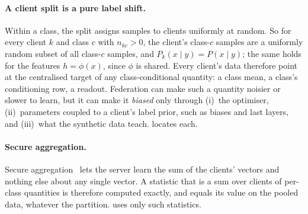 \paragraph{A client split is a pure label shift.} Within a class, the split assigns samples to clients uniformly at
random. So for every client $k$ and class $c$ with $n_{kc}>0$, the client's class-$c$ samples are a uniformly random
subset of all class-$c$ samples, and $P_k(x\mid y)=P(x\mid y)$; the same holds for the features $h=\phi(x)$, since
$\phi$ is shared. Every client's data therefore point at the centralised target of any class-conditional quantity: a
class mean, a class's conditioning row, a readout. Federation can make such a quantity noisier or slower to learn,
but it can make it \emph{biased} only through (i)~the optimiser, (ii)~parameters coupled to a client's label prior,
such as biases and last layers, and (iii)~what the synthetic data teach.  locates each.

\paragraph{Secure aggregation.} Secure aggregation~\cite{bonawitz2017secagg,bell2020secaggplus} lets the server learn
the sum of the clients' vectors and nothing else about any single vector. A statistic that is a sum over clients of
per-class quantities is therefore computed exactly, and equals its value on the pooled data, whatever the partition.
\ours uses only such statistics.
